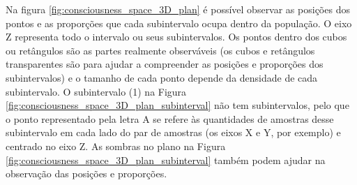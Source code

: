 Na figura \ref{fig:consciousness_space_3D_plan} é possível observar as posições dos pontos e as proporções que cada subintervalo ocupa dentro da população. O eixo Z representa todo o intervalo ou seus subintervalos. Os pontos dentro dos cubos ou retângulos são as partes realmente observáveis (os cubos e retângulos transparentes são para ajudar a compreender as posições e proporções dos subintervalos) e o tamanho de cada ponto depende da densidade de cada subintervalo. O subintervalo (1) na Figura \ref{fig:consciousness_space_3D_plan_subinterval} não tem subintervalos, pelo que o ponto representado pela letra A se refere às quantidades de amostras desse subintervalo em cada lado do par de amostras (os eixos X e Y, por exemplo) e centrado no eixo Z. As sombras no plano na Figura \ref{fig:consciousness_space_3D_plan_subinterval} também podem ajudar na observação das posições e proporções.
